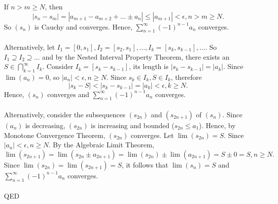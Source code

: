 \documentclass{article}
\begin{document}
            If $n>m \geq N$, then
            \begin{equation*}
                |s_n-s_m| = |a_{m+1}-a_{m+2}+\dots \pm a_n|  \leq |a_{m+1}| < \epsilon, n>m \geq N.
            \end{equation*}
            So $(s_n)$ is Cauchy and converges. Hence, $\sum_{n=1}^\infty (-1)^{n-1} a_n$ converges.\\ \\
            Alternatively, let $I_1=[0,s_1],I_2=[s_2,s_1],\dots,I_k=[s_k,s_{k-1}],\dots$. So $I_1 \supseteq I_2 \supseteq \dots $ and by the Nested Interval Property Theorem, there exists an $S \in \bigcap_{k=1}^\infty I_k$.
            Consider $I_k=[s_k-s_{k-1}]$, its length is $|s_k - s_{k-1}|=|a_k|$. Since $\lim(a_n)=0$, so $|a_n|<\epsilon,n \geq N$. Since $s_k \in I_k,S \in I_k$, therefore
            \begin{equation*}
                |s_k-S| < |s_k-s_{k-1}|=|a_k|<\epsilon,k \geq N.
            \end{equation*}
            Hence, $(s_n)$ converges and $\sum_{n=1}^\infty (-1)^{n-1}a_n$ converges.\\ \\
            Alternatively, consider the subsequences $(s_{2n})$ and $(s_{2n+1})$ of $(s_n)$. Since $(a_n)$ is decreasing, $(s_{2n})$ is increasing and bounded ($s_{2n} \leq a_1$). Hence, by Monotone Convergence Theorem, $(s_{2n})$ converges. Let $\lim(s_{2n})=S$. Since $|a_n|<\epsilon,n \geq N$. By the Algebraic Limit Theorem,
            \begin{equation*}
                \lim(s_{2n+1}) = \lim(s_{2n} \pm a_{2n+1}) = \lim(s_{2n}) \pm \lim(a_{2n+1}) = S \pm 0 = S, n \geq N.
            \end{equation*}
            Since $\lim(s_{2n})=\lim(s_{2n+1})=S$, it follows that $\lim(s_n)=S$ and $\sum_{n=1}^\infty (-1)^{n-1}a_n$ converges.
            \\ \\
            QED
            \\ \\
            
\end{document}
